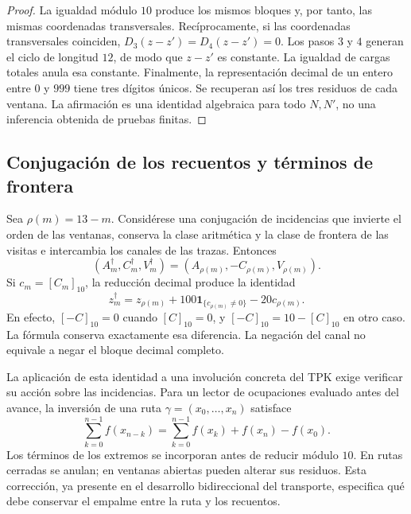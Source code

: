 \begin{proof}
La igualdad módulo \(10\) produce los mismos bloques y, por tanto,
las mismas coordenadas transversales. Recíprocamente, si las coordenadas
transversales coinciden, \(D_3(z-z')=D_4(z-z')=0\). Los pasos
\(3\) y \(4\) generan el ciclo de longitud \(12\), de modo que
\(z-z'\) es constante. La igualdad de cargas totales anula esa
constante. Finalmente, la representación decimal de un entero entre
\(0\) y \(999\) tiene tres dígitos únicos. Se recuperan así los
tres residuos de cada ventana. La afirmación es una identidad algebraica
para todo \(N,N'\), no una inferencia obtenida de pruebas finitas.
\end{proof}

\subsection{Conjugación de los recuentos y términos de frontera}
\label{x_reciprocidad:subsec:registro-conjugacion-incidencial}

Sea \(\rho(m)=13-m\). Considérese una conjugación de incidencias
que invierte el orden de las ventanas, conserva la clase aritmética y la
clase de frontera de las visitas e intercambia los canales de las trazas.
Entonces
\[
 (A_m^\dagger,C_m^\dagger,V_m^\dagger)
 =(A_{\rho(m)},-C_{\rho(m)},V_{\rho(m)}).
\]
Si \(c_m=[C_m]_{10}\), la reducción decimal produce la identidad
\begin{equation}
 z_m^\dagger=z_{\rho(m)}
       +100\mathbf1_{\{c_{\rho(m)}\ne0\}}-20c_{\rho(m)}.
 \label{x_reciprocidad:eq:registro-conjugacion-decimal}
\end{equation}
En efecto, \([-C]_{10}=0\) cuando \([C]_{10}=0\), y
\([-C]_{10}=10-[C]_{10}\) en otro caso. La fórmula conserva
exactamente esa diferencia. La negación del canal no equivale a negar
el bloque decimal completo.

La aplicación de esta identidad a una involución concreta del TPK exige
verificar su acción sobre las incidencias. Para un lector de ocupaciones
evaluado antes del avance, la inversión de una ruta
\(\gamma=(x_0,\ldots,x_n)\) satisface
\[
 \sum_{k=0}^{n-1}f(x_{n-k})
 =\sum_{k=0}^{n-1}f(x_k)+f(x_n)-f(x_0).
\]
Los términos de los extremos se incorporan antes de reducir módulo
\(10\). En rutas cerradas se anulan; en ventanas abiertas pueden
alterar sus residuos. Esta corrección, ya presente en el desarrollo
bidireccional del transporte, especifica qué debe conservar el empalme
entre la ruta y los recuentos.

